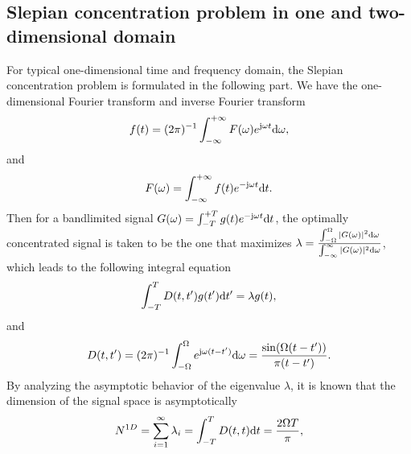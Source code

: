 \documentclass[12pt,draftclsnofoot,journal,onecolumn]{IEEEtran}
\begin{document}
	\subsection{Slepian concentration problem in one and two-dimensional domain}
	\label{subsec_1d2d_Selpian}
	For typical one-dimensional time and frequency domain, the Slepian concentration problem is formulated in the following part.
	We have the one-dimensional Fourier transform and inverse Fourier transform
	\begin{equation}
		\begin{aligned}
			f(t) = (2\pi)^{-1}\int_{-\infty}^{+\infty}F(\omega)e^{{\rm j}\omega t}{\rm d}\omega,
		\end{aligned}
	\end{equation}
	and
	\begin{equation}
		\begin{aligned}
			F(\omega) = \int_{-\infty}^{+\infty}f(t)e^{-{\rm j}\omega t}{\rm d}t.
		\end{aligned}
	\end{equation}
	Then for a bandlimited signal $G(\omega) = \int_{-T}^{+T}g(t)e^{-{\rm j}\omega t}{\rm d}t$, the optimally concentrated signal is taken to be the one that maximizes $\lambda = \frac{\int_{-\Omega}^{\Omega}|G(\omega)|^2{\rm d}\omega}{\int_{-\infty}^{\infty}|G(\omega)|^2{\rm d}\omega}$, which leads to the following integral equation
	\begin{equation}
	\begin{aligned}
		\int_{-T}^{T}D(t,t')g(t'){\rm d}t' = \lambda g(t),
	\end{aligned}
	\label{eqn_1d_t}
	\end{equation}
	and
	\begin{equation}
		\begin{aligned}
			D(t,t') = (2\pi)^{-1}\int_{-\Omega}^\Omega e^{{\rm j}\omega(t-t')}{\rm d}\omega = \frac{\sin(\Omega(t-t'))}{\pi(t-t')}.
		\end{aligned}
	\end{equation}
	By analyzing the asymptotic behavior of the eigenvalue $\lambda$, it is known that the dimension of the signal space is asymptotically
	\begin{equation}
		\begin{aligned}
			N^{1D} = \sum_{i=1}^\infty \lambda_i = \int_{-T}^{T}D(t,t){\rm d}t = \frac{2\Omega T}{\pi},
		\end{aligned}
	\end{equation}
\end{document}
